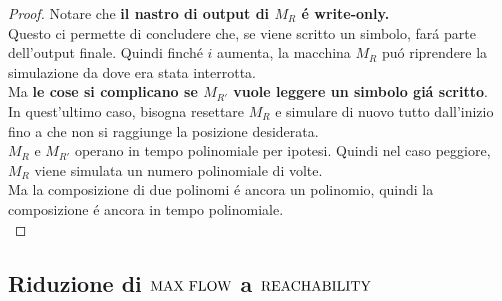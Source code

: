 \begin{proof}
    Notare che \textbf{il nastro di output di $M_R$ é write-only.} \\
    Questo ci permette di concludere che, se viene scritto un simbolo, fará parte dell'output finale.
    Quindi finché $i$ aumenta, la macchina $M_R$ puó riprendere la simulazione da dove era stata interrotta. \\
    Ma \textbf{le cose si complicano se $M_{R'}$ vuole leggere un simbolo giá scritto}. \\
    In quest'ultimo caso, bisogna resettare $M_R$ e simulare di nuovo tutto dall'inizio
    fino a che non si raggiunge la posizione desiderata. \\

    $M_R$ e $M_{R'}$ operano in tempo polinomiale per ipotesi. Quindi nel caso peggiore, $M_R$ viene simulata un numero polinomiale di volte. \\
    Ma la composizione di due polinomi é ancora un polinomio, quindi la composizione é ancora in tempo polinomiale. \\
\end{proof}


\subsection{Riduzione di $\text{MAX FLOW}$ a $\text{REACHABILITY}$}
\label{riduzione:maxflow_reachability}

